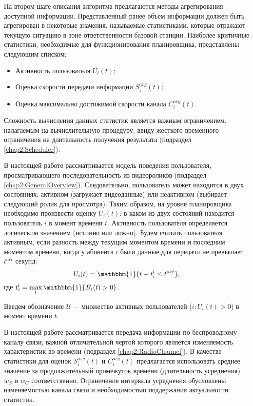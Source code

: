 На втором шаге описания алгоритма предлагаются методы агрегирования доступной информации. Представленный ранее объем информации должен быть агрегирован в некоторые значения, называемые статистиками, которые отражают текущую ситуацию в зоне ответственности базовой станции. Наиболее критичные статистики, необходимые для функционирования планировщика, представлены следующим списком:
\begin{itemize}
	\item Активность пользователя $U_i(t)$;
	\item Оценка скорости передачи информации $S_i^{avg}(t)$;
	\item Оценка максимально достижимой скорости канала $C_i^{avg}(t)$.
\end{itemize}
Сложность вычисления данных статистик является важным ограничением, налагаемым на вычислительную процедуру, ввиду жесткого временного ограничения на длительность получения результата (подраздел \ref{chap2:Scheduler}).

В настоящей работе рассматривается модель поведения пользователя, просматривающего последовательность из видеороликов (подраздел \ref{chap2:GeneralOverview}). Следовательно, пользователь может находится в двух состояниях: активном (загружает видеоданные) или неактивном (выбирает следующий ролик для просмотра). Таким образом, на уровне планировщика необходимо произвести оценку $U_i(t)$: в каком из двух состояний находится пользователь $i$ в момент времени $t$. Активность пользователя определяется логическим значением (истинно или ложно). Будем считать пользователя активным, если разность между текущим моментом времени и последним моментом времени, когда у абонента $i$ были данные для передачи не превышает $t^{act}$ секунд:
\begin{equation}
	\label{eq:activityEstimation}
	U_i(t) = \mathbbm{1}\{t - t_i^{l} \leq t^{act}\},
\end{equation}
где $t_i^{l} = \max\limits_{t} \mathbbm{1}\{B_i(t) > 0\}.$

Введем обозначение $\mathcal{U}$~--~множество активных пользователей ($i:U_i(t) > 0$) в момент времени $t$.

В настоящей работе рассматривается передача информации по беспроводному каналу связи, важной отличительной чертой которого является изменяемость характеристик во времени (подраздел \ref{chap2:RadioChannel}). В качестве статистики для оценок $S_i^{avg}(t)$ и $C_i^{avg}(t)$ предлагается использовать среднее значение за продолжительный промежуток времени (длительность усреднения) $\bar{w}_{S}$ и $\bar{w}_{C}$ соответственно. Ограничение интервала усреднения обусловлены изменяемостью канала связи и необходимостью поддержания актуальности статистик.

